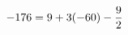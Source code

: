 \documentclass[preview]{standalone}
\begin{document}
\begin{align*}
\special{dvisvgm:raw <g id='unique000'>}-176 = 9 + 3(-60) - \frac{9}{2}\special{dvisvgm:raw </g>}
\end{align*}
\end{document}
